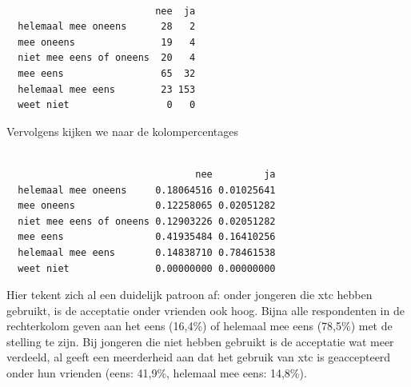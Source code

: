 \documentclass[
  letterpaper,
  DIV=11,
  numbers=noendperiod]{scrreprt}
\newenvironment{Shaded}{\begin{snugshade}}{\end{snugshade}}
\newcommand{\CommentTok}[1]{\textcolor[rgb]{0.37,0.37,0.37}{#1}}
\newcommand{\DecValTok}[1]{\textcolor[rgb]{0.68,0.00,0.00}{#1}}
\newcommand{\FunctionTok}[1]{\textcolor[rgb]{0.28,0.35,0.67}{#1}}
\newcommand{\NormalTok}[1]{\textcolor[rgb]{0.00,0.23,0.31}{#1}}
\newcommand{\SpecialCharTok}[1]{\textcolor[rgb]{0.37,0.37,0.37}{#1}}
\begin{document}
\begin{Shaded}
\end{Shaded}

\begin{verbatim}
                         
                          nee  ja
  helemaal mee oneens      28   2
  mee oneens               19   4
  niet mee eens of oneens  20   4
  mee eens                 65  32
  helemaal mee eens        23 153
  weet niet                 0   0
\end{verbatim}

Vervolgens kijken we naar de kolompercentages

\begin{Shaded}
\end{Shaded}

\begin{verbatim}
                         
                                 nee         ja
  helemaal mee oneens     0.18064516 0.01025641
  mee oneens              0.12258065 0.02051282
  niet mee eens of oneens 0.12903226 0.02051282
  mee eens                0.41935484 0.16410256
  helemaal mee eens       0.14838710 0.78461538
  weet niet               0.00000000 0.00000000
\end{verbatim}

Hier tekent zich al een duidelijk patroon af: onder jongeren die xtc
hebben gebruikt, is de acceptatie onder vrienden ook hoog. Bijna alle
respondenten in de rechterkolom geven aan het eens (16,4\%) of helemaal
mee eens (78,5\%) met de stelling te zijn. Bij jongeren die niet hebben
gebruikt is de acceptatie wat meer verdeeld, al geeft een meerderheid
aan dat het gebruik van xtc is geaccepteerd onder hun vrienden (eens:
41,9\%, helemaal mee eens: 14,8\%).
\end{document}
